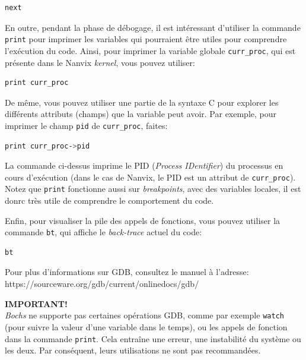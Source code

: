 \documentclass[11pt]{article}
\newcommand*{\alert}[1]{\vspace{0.4cm}\colorbox{gray!60!white}{\parbox{0.92\linewidth}{{\centering \textbf{IMPORTANT!}\\}#1}}\vspace{0.4cm}}
\begin{document}
\begin{lstlisting}[language=sh,numbers=none,frame=single]
next
\end{lstlisting}

\vspace{0.3cm}
En outre, pendant la phase de débogage, il est
intéressant d'utiliser la commande \texttt {print} pour imprimer les
variables qui pourraient être utiles pour comprendre l'exécution du
code. Ainsi, pour imprimer la variable globale \texttt {curr\_proc}, qui
est présente dans le Nanvix \textit {kernel}, vous pouvez utiliser: \\

\begin{lstlisting}[language=sh,numbers=none,frame=single]
print curr_proc
\end{lstlisting}

De même, vous pouvez utiliser une partie de la syntaxe C pour explorer
les différents attributs (champs) que la variable peut avoir. Par exemple,
pour imprimer le champ \texttt{pid} de \texttt {curr\_proc}, faites: \\

\begin{lstlisting}[language=sh,numbers=none,frame=single]
print curr_proc->pid
\end{lstlisting}

\vspace{0.3cm}
La commande ci-dessus imprime le PID (\textit{Process IDentifier})
du processus en cours d'exécution (dans le cas de Nanvix, le PID
est un attribut de \texttt{curr\_proc}).  Notez que \texttt {print}
fonctionne aussi sur \textit {breakpoints}, avec des variables locales,
il est donrc très utile de comprendre le comportement du code.

Enfin, pour visualiser la pile des appels de fonctions, vous pouvez
utiliser la commande \texttt {bt}, qui affiche le \textit {back-trace}
actuel du code: \\

\begin{lstlisting}[language=sh,numbers=none,frame=single]
bt
\end{lstlisting}

\vspace{0.3cm} Pour plus d'informations sur GDB, consultez le manuel à
l'adresse: https://sourceware.org/gdb/current/onlinedocs/gdb/

\alert{\textit{Bochs} ne supporte pas certaines opérations GDB,
  comme par exemple \texttt {watch} (pour suivre la valeur
  d'une variable dans le temps), ou les appels de fonction dans
  la commande \texttt{print}. Cela entraîne une erreur, une instabilité du
  système ou les deux. Par conséquent, leurs utilisations ne sont pas
  recommandées.}
\end{document}
